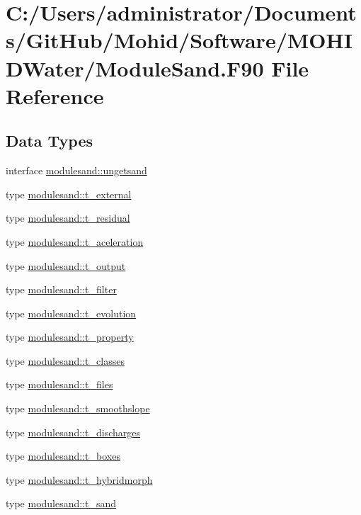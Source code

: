 \hypertarget{_module_sand_8_f90}{}\section{C\+:/\+Users/administrator/\+Documents/\+Git\+Hub/\+Mohid/\+Software/\+M\+O\+H\+I\+D\+Water/\+Module\+Sand.F90 File Reference}
\label{_module_sand_8_f90}
\subsection*{Data Types}
\begin{DoxyCompactItemize}
\item 
interface \mbox{\hyperlink{interfacemodulesand_1_1ungetsand}{modulesand\+::ungetsand}}
\item 
type \mbox{\hyperlink{structmodulesand_1_1t__external}{modulesand\+::t\+\_\+external}}
\item 
type \mbox{\hyperlink{structmodulesand_1_1t__residual}{modulesand\+::t\+\_\+residual}}
\item 
type \mbox{\hyperlink{structmodulesand_1_1t__aceleration}{modulesand\+::t\+\_\+aceleration}}
\item 
type \mbox{\hyperlink{structmodulesand_1_1t__output}{modulesand\+::t\+\_\+output}}
\item 
type \mbox{\hyperlink{structmodulesand_1_1t__filter}{modulesand\+::t\+\_\+filter}}
\item 
type \mbox{\hyperlink{structmodulesand_1_1t__evolution}{modulesand\+::t\+\_\+evolution}}
\item 
type \mbox{\hyperlink{structmodulesand_1_1t__property}{modulesand\+::t\+\_\+property}}
\item 
type \mbox{\hyperlink{structmodulesand_1_1t__classes}{modulesand\+::t\+\_\+classes}}
\item 
type \mbox{\hyperlink{structmodulesand_1_1t__files}{modulesand\+::t\+\_\+files}}
\item 
type \mbox{\hyperlink{structmodulesand_1_1t__smoothslope}{modulesand\+::t\+\_\+smoothslope}}
\item 
type \mbox{\hyperlink{structmodulesand_1_1t__discharges}{modulesand\+::t\+\_\+discharges}}
\item 
type \mbox{\hyperlink{structmodulesand_1_1t__boxes}{modulesand\+::t\+\_\+boxes}}
\item 
type \mbox{\hyperlink{structmodulesand_1_1t__hybridmorph}{modulesand\+::t\+\_\+hybridmorph}}
\item 
type \mbox{\hyperlink{structmodulesand_1_1t__sand}{modulesand\+::t\+\_\+sand}}
\end{DoxyCompactItemize}
